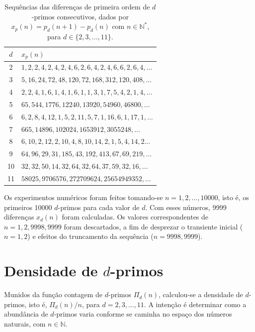 \documentclass[12pt,a4paper,fleqn]{report}
\begin{document}
\begin{table}[h]
\begin{center}
\caption{Sequências das diferenças de primeira ordem de $d$-primos consecutivos,
dados por $x_p(n)=p_d(n+1)-p_d(n)$ com $n \in \mathbb{N}^*$, para $d \in \{2,3,...,11\}$.\\}
        \begin{tabular}{|c|l|} \hline
        $d$ & $x_p(n)$ \\
        \hline 2 & $1, 2, 2, 4, 2, 4, 2, 4, 6, 2, 6, 4, 2, 4, 6, 6, 2, 6, 4, \ldots$ \\
        3 & $5, 16, 24, 72, 48, 120, 72, 168, 312, 120, 408, \ldots$ \\
        4 & $2, 2, 4, 1, 6, 1, 4, 1, 6, 1, 1, 3, 1, 7, 5, 4, 2, 1, 4, \ldots$ \\
        5 & $65, 544, 1776, 12240, 13920, 54960, 46800,
        \ldots$ \\
        6 & $6, 2, 8, 4, 12, 1, 5, 2, 11, 5, 7, 1, 16, 6, 1, 17, 1,  \ldots$ \\
        7 & $665, 14896, 102024, 1653912, 3055248, \ldots$ \\
        8 & $6, 10, 2, 12, 2, 10, 4, 8, 10, 14, 2, 1, 5, 4, 14, 2  \ldots$ \\
        9 & $64, 96, 29, 31, 185, 43, 192, 413, 67, 69, 219, \ldots$ \\
        10 & $32, 32, 50, 14, 32, 64, 32, 64, 37, 59, 32, 16,  \ldots$ \\
        11 & $58025, 9706576, 272709624, 25654949352, \ldots$ \\
        \hline
    \end{tabular}
    \label{tab:d-primes}
\end{center}
\end{table}

Os experimentos numéricos foram feitos tomando-se $n=1, 2, \ldots, 10000$,
isto é, os primeiros 10000 $d$-primos para cada valor de $d$. Com esses
números, 9999 diferenças $x_d(n)$ foram calculadas. Os valores
correspondentes de $n=1, 2, 9998, 9999$ foram descartados, a fim de desprezar o transiente inicial ($n=1,2$) e  efeitos do truncamento da sequência
($n=9998,9999$).


\section{Densidade de $d$-primos}

Munidos da função  contagem de $d$-primos $\Pi_d(n)$, calculou-se a densidade
de $d$-primos, isto é, $\Pi_d(n)/n$, para $d=2,3,\ldots,11$.
A intenção é determinar como a abundância de $d$-primos varia conforme se caminha no espaço dos números naturais, com $n \in \mathbb{N}$.
\end{document}

